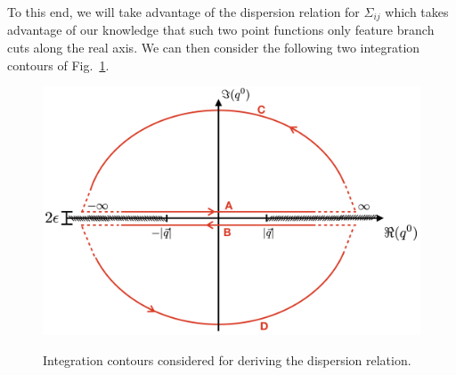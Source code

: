 \documentclass[11pt]{article}
\begin{document}
To this end, we will take advantage of the dispersion relation for $\Sigma_{ij}$ which takes advantage of our knowledge that such two point functions only feature branch cuts along the real axis. We can then consider the following two integration contours of Fig.~\ref{IntegrationContours}.

\begin{figure}[ht!]
\begin{center}
\begin{minipage}{0.65\linewidth}
\centering
{\caption{\label{IntegrationContours} Integration contours considered for deriving the dispersion relation.}}
{\includegraphics[width=0.65\linewidth]{integration_contour.png}}
\end{minipage}\hfill
\end{center}
\end{figure}
\end{document}
